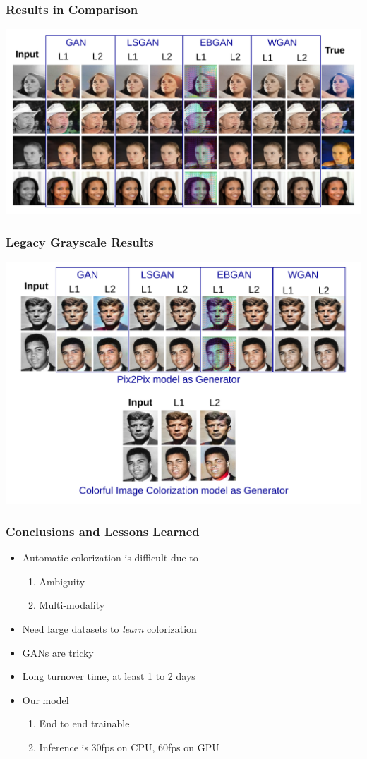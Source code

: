 \documentclass{beamer}
\begin{document}
\begin{frame}
\frametitle{\textbf{Results in Comparison}}
\centering
\includegraphics[width= \linewidth]{13.pdf}
\end{frame}

\begin{frame}
\frametitle{\textbf{Legacy Grayscale Results}}
\centering
\includegraphics[width= 0.95 \linewidth]{14.pdf}
\end{frame}

\begin{frame}
\frametitle{\textbf{Conclusions and Lessons Learned}}

\begin{itemize}
\item Automatic colorization is difficult due to
\begin{enumerate}[$-$]
\item Ambiguity
\item Multi-modality
\end{enumerate}
\item Need large datasets to \textit{learn} colorization
\item GANs are tricky
\item Long turnover time, at least 1 to 2 days
\end{itemize}

\begin{itemize}
\item Our model
\begin{enumerate}[$-$]
\item End to end trainable
\item Inference is 30fps on CPU, 60fps on GPU
\end{enumerate}
\end{itemize}
\end{frame}
\end{document}
